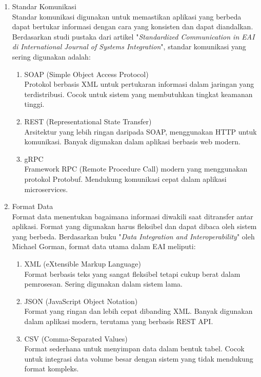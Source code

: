 \begin{enumerate}[label*=\arabic*.,ref=\arabic*]
\begin{enumerate}[label=\alph*.]
            \item Standar Komunikasi \\
            Standar komunikasi digunakan untuk memastikan aplikasi yang berbeda dapat bertukar informasi dengan cara yang konsisten dan dapat diandalkan. Berdasarkan studi pustaka dari artikel "\textit{Standardized Communication in EAI di International Journal of Systems Integration}", standar komunikasi yang sering digunakan adalah:
            \begin{enumerate}[label=\alph*.]
                \item SOAP (Simple Object Access Protocol) \\ 
                Protokol berbasis XML untuk pertukaran informasi dalam jaringan yang terdistribusi. Cocok untuk sistem yang membutuhkan tingkat keamanan tinggi.
                \item REST (Representational State Transfer) \\ 
                Arsitektur yang lebih ringan daripada SOAP, menggunakan HTTP untuk komunikasi. Banyak digunakan dalam aplikasi berbasis web modern.
                \item gRPC \\ 
                Framework RPC (Remote Procedure Call) modern yang menggunakan protokol Protobuf. Mendukung komunikasi cepat dalam aplikasi microservices.
            \end{enumerate}
            
            \item Format Data \\
            Format data menentukan bagaimana informasi diwakili saat ditransfer antar aplikasi. Format yang digunakan harus fleksibel dan dapat dibaca oleh sistem yang berbeda. Berdasarkan buku "\textit{Data Integration and Interoperability}" oleh Michael Gorman, format data utama dalam EAI meliputi:
            \begin{enumerate}[label=\alph*.]
                \item XML (eXtensible Markup Language) \\ 
                Format berbasis teks yang sangat fleksibel tetapi cukup berat dalam pemrosesan. Sering digunakan dalam sistem lama.
                \item JSON (JavaScript Object Notation) \\ 
                Format yang ringan dan lebih cepat dibanding XML. Banyak digunakan dalam aplikasi modern, terutama yang berbasis REST API.
                \item CSV (Comma-Separated Values) \\
                Format sederhana untuk menyimpan data dalam bentuk tabel. Cocok untuk integrasi data volume besar dengan sistem yang tidak mendukung format kompleks.
            \end{enumerate}
            

\end{enumerate}
\end{enumerate}
